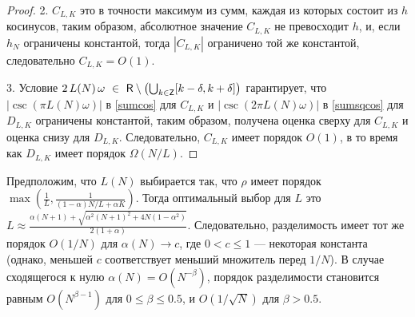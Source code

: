 \documentclass[12pt, specialist, subf,href,colorlinks=true,substylefile = spbu.rtx]{disser}
\newtheorem{proposition}{Предложение}
\theoremstyle{remark}
\theoremstyle{definition}
\begin{document}
\begin{proof}
	2. $C_{L,K}$ это в точности максимум из сумм, каждая из которых состоит из $h$ косинусов, таким образом, абсолютное значение $C_{L,K}$ не превосходит $h$, и, если $h_N$ ограничены константой, тогда $|C_{L,K}|$ ограничено той же константой, следовательно $C_{L,K} = O(1)$.
	
	3. Условие $2\,L(N)\,\omega~\in~ \mathsf{R} \setminus \left(\bigcup_{k \in \mathsf{Z}} [k - \delta, k + \delta] \right)$ гарантирует, что $|\csc(\pi L(N) \omega)|$ в \eqref{sumcos} для $C_{L,K}$ и $|\csc(2 \pi L(N) \omega)|$ в \eqref{sumsqcos} для $D_{L,K}$ ограничены константой, таким образом, получена оценка сверху для $C_{L,K}$ и оценка снизу для $D_{L,K}$. Следовательно, $C_{L, K}$ имеет порядок $O(1)$, в то время как $D_{L, K}$ имеет порядок $\Omega(N/L)$.
\end{proof}

Предположим, что $L(N)$ выбирается так, что $\rho$ имеет порядок $\max\left(\frac{1}{L}, \frac{1}{(1-\alpha)N/L+\alpha K}\right)$. Тогда оптимальный выбор для $L$ это $L \approx \frac{\alpha(N + 1) + \sqrt{\alpha^2(N+1)^2 + 4N(1  - \alpha^2)}}{2(1 + \alpha)}$.
Следовательно, разделимость имеет тот же порядок $O(1/N)$  для $\alpha(N) \to c$, где $0<c\le 1$ --- некоторая константа (однако, меньшей $c$ соответствует меньший множитель перед $1/N$). В случае сходящегося к нулю $\alpha(N) = O(N^{-\beta})$, порядок разделимости становится равным $O(N^{\beta - 1})$ для $0 \le \beta \le 0.5$, и $O(1/\sqrt{N})$ для $\beta > 0.5$.
%
%
%
\end{document}
